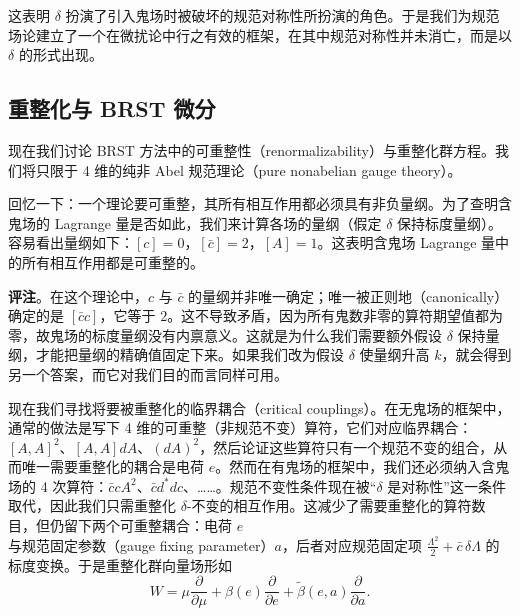 
这表明 $\delta$ 扮演了引入鬼场时被破坏的规范对称性所扮演的角色。于是我们为规范场论建立了一个在微扰论中行之有效的框架，在其中规范对称性并未消亡，而是以 $\delta$ 的形式出现。

\subsection{重整化与 BRST 微分}

现在我们讨论 BRST 方法中的可重整性（renormalizability）与重整化群方程。我们将只限于 4 维的纯非 Abel 规范理论（pure nonabelian gauge theory）。

回忆一下：一个理论要可重整，其所有相互作用都必须具有非负量纲。为了查明含鬼场的 Lagrange 量是否如此，我们来计算各场的量纲（假定 $\delta$ 保持标度量纲）。容易看出量纲如下：$[c]=0$，$[\bar c]=2$，$[A]=1$。这表明含鬼场 Lagrange 量中的所有相互作用都是可重整的。

\textbf{评注}。在这个理论中，$c$ 与 $\bar c$ 的量纲并非唯一确定；唯一被正则地（canonically）确定的是 $[\bar cc]$，它等于 $2$。这不导致矛盾，因为所有鬼数非零的算符期望值都为零，故鬼场的标度量纲没有内禀意义。这就是为什么我们需要额外假设 $\delta$ 保持量纲，才能把量纲的精确值固定下来。如果我们改为假设 $\delta$ 使量纲升高 $k$，就会得到另一个答案，而它对我们目的而言同样可用。


现在我们寻找将要被重整化的临界耦合（critical couplings）。在无鬼场的框架中，通常的做法是写下 4 维的可重整（非规范不变）算符，它们对应临界耦合：$[A,A]^2$、$[A,A]dA$、$(dA)^2$，然后论证这些算符只有一个规范不变的组合，从而唯一需要重整化的耦合是电荷 $e$。然而在有鬼场的框架中，我们还必须纳入含鬼场的 4 次算符：$\bar ccA^2$、$\bar cd^*dc$、……。规范不变性条件现在被“$\delta$ 是对称性”这一条件取代，因此我们只需重整化 $\delta$-不变的相互作用。这减少了需要重整化的算符数目，但仍留下两个可重整耦合：电荷 $e$ 与规范固定参数（gauge fixing parameter）$a$，后者对应规范固定项 $\frac{\Lambda^2}{2}+\bar c\,\delta\Lambda$ 的标度变换。于是重整化群向量场形如
\[
  W=\mu\frac{\partial}{\partial\mu}+\beta(e)\frac{\partial}{\partial e}+\widetilde{\beta}(e,a)\frac{\partial}{\partial a}.
\]

